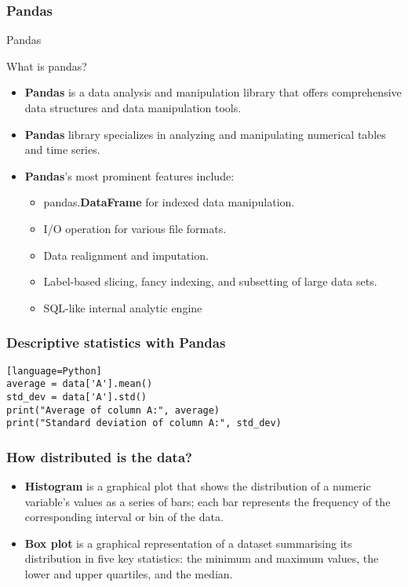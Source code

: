 \documentclass{beamer}
\begin{document}
    \subsubsection{Pandas}
    \begin{frame}[fragile]{Pandas}
        \begin{block}{What is pandas?}
            \begin{itemize}
                \item \textbf{Pandas} is a data analysis and manipulation library that offers comprehensive data structures and data manipulation tools.
                \item \textbf{Pandas} library specializes in analyzing and manipulating numerical tables and time series.
                \item \textbf{Pandas}'s most prominent features include:
                \begin{itemize}
                    \item pandas.\textbf{DataFrame} for indexed data manipulation.
                    \item I/O operation for various file formats.
                    \item Data realignment and imputation.
                    \item Label-based slicing, fancy indexing, and subsetting of large data sets.
                    \item SQL-like internal analytic engine
                \end{itemize}
            \end{itemize}
        \end{block}
    \end{frame}

    \begin{frame}[fragile]
    \frametitle{Descriptive statistics with Pandas}
    \begin{lstlisting}[caption=Calculating the average and standard deviation of a column using Pandas][language=Python]
average = data['A'].mean()
std_dev = data['A'].std()
print("Average of column A:", average)
print("Standard deviation of column A:", std_dev)
    \end{lstlisting}
    \end{frame}
    \begin{frame}[fragile]
        \frametitle{How distributed is the data?}
        \begin{itemize}
            \item \textbf{Histogram} is a graphical plot that shows the distribution of a numeric variable's values as a series of bars; each bar represents the frequency of the corresponding interval or bin of the data.
            \item \textbf{Box plot} is a graphical representation of a dataset summarising its distribution in five key statistics: the minimum and maximum values, the lower and upper quartiles, and the median.
        \end{itemize}
    \end{frame}
\end{document}
